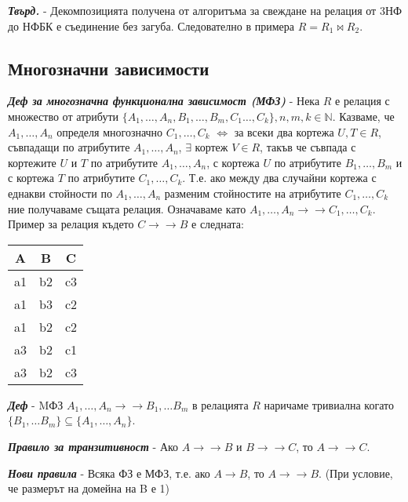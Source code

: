 \documentclass[fleqn,12pt]{article}
\begin{document}
\textbf{\textit{Твърд.}} - Декомпозицията получена от алгоритъма за свеждане на релация от 3НФ до НФБК е съединение без загуба.
Следователно в примера $R = R_1 \bowtie R_2$.

\subsection{Многозначни зависимости}

\textbf{\textit{Деф за многозначна функционална зависимост (МФЗ)}} - Нека $R$ е релация с множество от атрибути $\{A_1, \dots, A_n, B_1, \dots, B_m, C_1 \dots, C_k\}, n, m, k \in \mathbb{N}$.
Казваме, че $A_1, \dots, A_n$ определя многозначно $C_1, \dots, C_k$ $\iff$ за всеки два кортежа $U, T \in R$, съвпадащи по атрибутите $A_1, \dots, A_n$, $\exists$ кортеж $V \in R$, такъв че съвпада с кортежите $U$ и $T$ по атрибутите $A_1, \dots, A_n$, с кортежа $U$ по атрибутите $B_1, \dots, B_m$ и с кортежа $T$ по атрибутите $C_1, \dots, C_k$.
Т.е. ако между два случайни кортежа с еднакви стойности по $A_1, \dots, A_n$ разменим стойностите на атрибутите $C_1, \dots, C_k$ ние получаваме същата релация.
Означаваме като $A_1, \dots, A_n \rightarrow \rightarrow C_1, \dots, C_k$.
\bigbreak
Пример за релация където $C \rightarrow \rightarrow B$ е следната:

\begin{center}
\begin{tabular}{ |c|c|c| } 
    \hline
    A & B & C \\
    \hline
    a1 & b2 & c3 \\ 
    a1 & b3 & c2 \\ 
    a1 & b2 & c2 \\ 
    a3 & b2 & c1 \\
    a3 & b2 & c3 \\
    \hline
\end{tabular}
\end{center}

\textbf{\textit{Деф}} - MФЗ $A_1, \dots, A_n \rightarrow \rightarrow B_1, \dots B_m$ в релацията $R$ наричаме тривиална когато $\{B_1, \dots B_m\} \subseteq \{A_1, \dots, A_n\}$.

\textbf{\textit{Правило за транзитивност}} - Ако $A \rightarrow \rightarrow B$ и $B \rightarrow \rightarrow C$, то $A \rightarrow \rightarrow C$.

\textbf{\textit{Нови правила}} - Всяка ФЗ е МФЗ, т.е. ако $A \rightarrow B$, то $A \rightarrow \rightarrow B$. (При условие, че размерът на домейна на B е 1)
\end{document}
